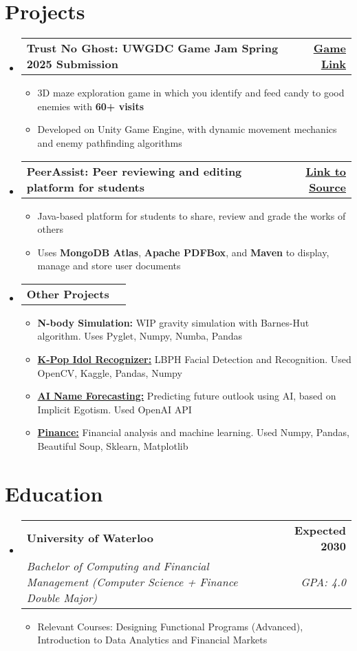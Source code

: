 \documentclass[letterpaper,11pt]{article}
\makeatletter
\newcommand{\resumeItem}[1]{
  \item\small{
    {#1 \vspace{-2pt}}
  }
}
\newcommand{\resumeSubheading}[4]{
  \vspace{-2pt}\item
    \begin{tabular*}{1.0\textwidth}[t]{l@{\extracolsep{\fill}}r}
      \textbf{#1} & \textbf{\small #2} \\
      \textit{\small#3} & \textit{\small #4} \\
    \end{tabular*}\vspace{-7pt}
}
\newcommand{\resumeProjectHeading}[2]{
    \item
    \begin{tabular*}{1.001\textwidth}{l@{\extracolsep{\fill}}r}
      \small#1 & \textbf{\small #2}\\
    \end{tabular*}\vspace{-7pt}
}
\newcommand{\resumeSubHeadingListStart}{\begin{itemize}[leftmargin=0.0in, label={}]}
\newcommand{\resumeSubHeadingListEnd}{\end{itemize}}
\newcommand{\resumeItemListStart}{\begin{itemize}}
\newcommand{\resumeItemListEnd}{\end{itemize}\vspace{-5pt}}
\makeatother
\begin{document}
\section{Projects}
\vspace{-5pt}
\resumeSubHeadingListStart
    \resumeProjectHeading{\textbf{Trust No Ghost: UWGDC Game Jam Spring 2025 Submission}}{\href{https://ianleung12.itch.io/trust-no-ghost}{\underline{Game Link}}}
    \resumeItemListStart
        \resumeItem{3D maze exploration game in which you identify and feed candy to good enemies with \textbf{60+ visits}}
        \resumeItem{Developed on Unity Game Engine,  with dynamic movement mechanics and enemy pathfinding algorithms}
    \resumeItemListEnd
    \vspace{-18pt}
    \resumeProjectHeading{\textbf{PeerAssist: Peer reviewing and editing platform for students }}{\href{https://github.com/IanLeung12/PeerAssist}{\underline{Link to Source}}}
    \resumeItemListStart
        \resumeItem{Java-based platform for students to share, review and grade the works of others}
        \resumeItem{Uses \textbf{MongoDB Atlas}, \textbf{Apache PDFBox}, and \textbf{Maven }to display, manage and store user documents}
    \resumeItemListEnd
    \vspace{-18pt}
    \resumeProjectHeading{\textbf{Other Projects}}{}
    \resumeItemListStart
        \resumeItem{\textbf{N-body Simulation:} WIP gravity simulation with Barnes-Hut algorithm. Uses Pyglet, Numpy, Numba, Pandas}
        \resumeItem{\href{https://github.com/IanLeung12/ai-skill-showcase}{\textbf{K-Pop Idol Recognizer:}} LBPH Facial Detection and Recognition. Used OpenCV, Kaggle, Pandas, Numpy}
        \resumeItem{\href{https://github.com/IanLeung12/AI-Name-Forecasting}{\textbf{AI Name Forecasting:}} Predicting future outlook using AI, based on Implicit Egotism. Used OpenAI API}
        \resumeItem{\href{https://github.com/IanLeung12/Pinance}{\textbf{Pinance:}} Financial analysis and machine learning. Used Numpy, Pandas, Beautiful Soup, Sklearn, Matplotlib}
    \resumeItemListEnd
    \vspace{-15pt}
    
\resumeSubHeadingListEnd
\vspace{-1pt}

\section{Education}
\resumeSubHeadingListStart
\resumeSubheading
{University of Waterloo}{Expected 2030} 
{Bachelor of Computing and Financial Management (Computer Science + Finance Double Major)}{GPA: 4.0}
\resumeItemListStart
\resumeItem{Relevant Courses: Designing Functional Programs (Advanced), Introduction to Data Analytics and Financial Markets}
\resumeItemListEnd
\resumeSubHeadingListEnd
\vspace{-10pt}
\end{document}
